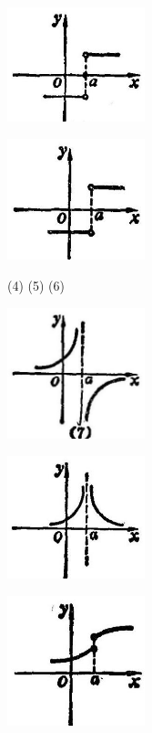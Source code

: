 \documentclass[10pt]{article}
\begin{document}
\begin{center}
\includegraphics[max width=0.3\textwidth]{images/01912c18-5c3f-733d-b775-749ba9897a9d_36_222184.jpg}
\end{center}

\begin{center}
\includegraphics[max width=0.3\textwidth]{images/01912c18-5c3f-733d-b775-749ba9897a9d_36_774109.jpg}
\end{center}

(4) (5) (6)

\begin{center}
\includegraphics[max width=0.3\textwidth]{images/01912c18-5c3f-733d-b775-749ba9897a9d_36_255638.jpg}
\end{center}

\begin{center}
\includegraphics[max width=0.3\textwidth]{images/01912c18-5c3f-733d-b775-749ba9897a9d_36_333878.jpg}
\end{center}

\begin{center}
\includegraphics[max width=0.3\textwidth]{images/01912c18-5c3f-733d-b775-749ba9897a9d_36_561922.jpg}
\end{center}
\end{document}
